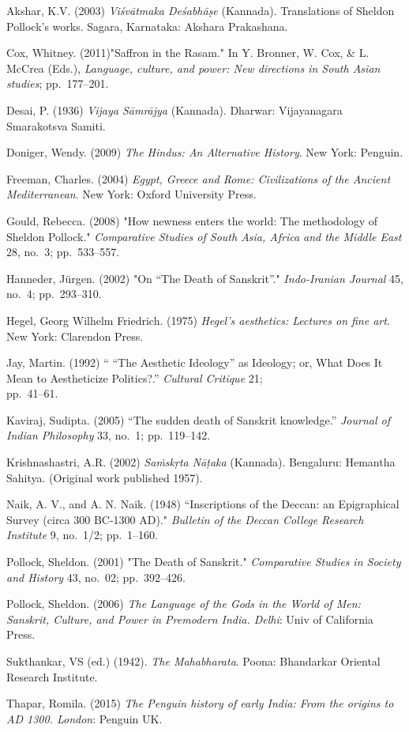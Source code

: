 \begin{thebibliography}{99}
\itemsep=2pt
Akshar, K.V. (2003) {\sl Viśvātmaka Deśabhāṣe} (Kannada). Translations of Sheldon Pollock’s works. Sagara, Karnataka: Akshara Prakashana.

Cox, Whitney. (2011)"Saffron in the Rasam." In Y. Bronner, W. Cox, \& L. McCrea (Eds.), {\sl Language, culture, and power: New directions in South Asian studies}; pp.~177--201.

Desai, P. (1936) {\sl Vijaya Sāmrājya} (Kannada). Dharwar: Vijayanagara Smarakotsva Samiti.

Doniger, Wendy. (2009) {\sl The Hindus: An Alternative History}. New York: Penguin.

Freeman, Charles. (2004) {\sl Egypt, Greece and Rome: Civilizations of the Ancient Mediterranean}. New York: Oxford University Press.

Gould, Rebecca. (2008) "How newness enters the world: The methodology of Sheldon Pollock." {\sl Comparative Studies of South Asia, Africa and the Middle East} 28, no.~3; pp.~533--557.

Hanneder, Jürgen. (2002) "On “The Death of Sanskrit”." {\sl Indo-Iranian Journal} 45, no.~4; pp.~293--310.

Hegel, Georg Wilhelm Friedrich. (1975) {\sl Hegel's aesthetics: Lectures on fine art}. New York: Clarendon Press.

Jay, Martin. (1992) “ “The Aesthetic Ideology” as Ideology; or, What Does It Mean to Aestheticize Politics?.” {\sl Cultural Critique} 21;\\ pp.~41--61.

Kaviraj, Sudipta. (2005) “The sudden death of Sanskrit knowledge.” {\sl Journal of Indian Philosophy} 33, no.~1; pp.~119--142.

Krishnashastri, A.R. (2002) {\sl Saṁskṛta Nāṭaka} (Kannada). Bengaluru: Hemantha Sahitya. (Original work published 1957).

Naik, A. V., and A. N. Naik. (1948) “Inscriptions of the Deccan: an Epigraphical Survey (circa 300 BC-1300 AD)." {\sl Bulletin of the Deccan College Research Institute} 9, no.~1/2; pp.~1--160.

Pollock, Sheldon. (2001) "The Death of Sanskrit." {\sl Comparative Studies in Society and History} 43, no.~02; pp.~392--426.

Pollock, Sheldon. (2006) {\sl The Language of the Gods in the World of Men: Sanskrit, Culture, and Power in Premodern India. Delhi}: Univ of California Press.

Sukthankar, VS  (ed.) (1942). {\sl The Mahabharata}. Poona: Bhandarkar Oriental Research Institute.

Thapar, Romila. (2015) {\sl The Penguin history of early India: From the origins to AD 1300. London}: Penguin UK.

\end{thebibliography}
